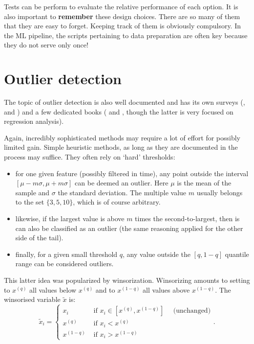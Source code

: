 \documentclass[]{krantz}
\providecommand{\tightlist}{%
  \setlength{\itemsep}{0pt}\setlength{\parskip}{0pt}}
\theoremstyle{definition}
\theoremstyle{definition}
\theoremstyle{definition}
\theoremstyle{remark}
\begin{document}
Tests can be perform to evaluate the relative performance of each
option. It is also important to \textbf{remember} these design choices.
There are so many of them that they are easy to forget. Keeping track of
them is obviously compulsory. In the ML pipeline, the scripts pertaining
to data preparation are often key because they do not serve only once!

\hypertarget{outlier-detection}{%
\section{Outlier detection}\label{outlier-detection}}

The topic of outlier detection is also well documented and has its own
surveys (\citet{hodge2004survey}, \citet{chandola2009anomaly} and
\citet{gupta2014outlier}) and a few dedicated books
(\citet{aggarwal2013outlier} and \citet{rousseeuw2005robust}, though the
latter is very focused on regression analysis).

Again, incredibly sophisticated methods may require a lot of effort for
possibly limited gain. Simple heuristic methods, as long as they are
documented in the process may suffice. They often rely on `hard'
thresholds:

\begin{itemize}
\tightlist
\item
  for one given feature (possibly filtered in time), any point outside
  the interval \([\mu-m\sigma, \mu+m\sigma]\) can be deemed an outlier.
  Here \(\mu\) is the mean of the sample and \(\sigma\) the standard
  deviation. The multiple value \(m\) usually belongs to the set
  \(\{3, 5, 10\}\), which is of course arbitrary.
\item
  likewise, if the largest value is above \(m\) times the
  second-to-largest, then is can also be classified as an outlier (the
  same reasoning applied for the other side of the tail).
\item
  finally, for a given small threshold \(q\), any value outside the
  \([q,1-q]\) quantile range can be considered outliers.
\end{itemize}

This latter idea was popularized by winsorization. Winsorizing amounts
to setting to \(x^{(q)}\) all values below \(x^{(q)}\) and to
\(x^{(1-q)}\) all values above \(x^{(1-q)}\). The winsorised variable
\(\tilde{x}\) is: \[\tilde{x}_i=\left\{\begin{array}{ll}
x_i & \text{ if }  x_i \in [x^{(q)},x^{(1-q)}] \quad \text{ (unchanged)}\\
x^{(q)} & \text{ if }  x_i < x^{(q)} \\
x^{(1-q)} & \text{ if }  x_i > x^{(1-q)}
 \end{array} \right. .\]
\end{document}
